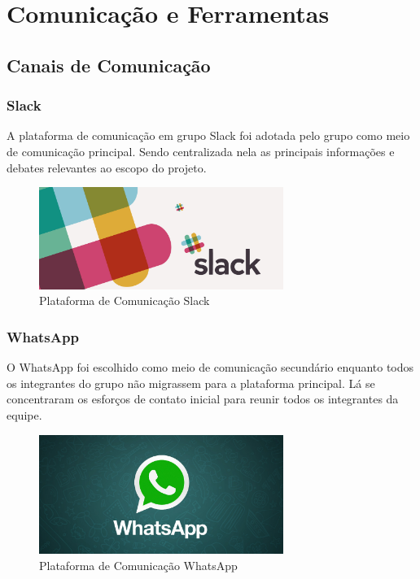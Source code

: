 \chapter[Comunicação e Ferramentas]{Comunicação e Ferramentas}

\section{Canais de Comunicação}

\subsection{Slack}
A plataforma de comunicação em grupo Slack foi adotada pelo grupo como meio de comunicação principal.
Sendo centralizada nela as principais informações e debates relevantes ao escopo do projeto.

\begin{figure}[h]
  \centering
  \includegraphics[width=300px, scale=0.5]{figuras/slack}
  \caption{Plataforma de Comunicação Slack}
  \label{table:slack}
\end{figure}


\subsection{WhatsApp}
O WhatsApp foi escolhido como meio de comunicação secundário enquanto todos os integrantes do grupo
não migrassem para a plataforma principal. Lá se concentraram os esforços de contato inicial para reunir
todos os integrantes da equipe.

\begin{figure}[h]
  \centering
  \includegraphics[width=300px, scale=0.5]{figuras/wpp}
  \caption{Plataforma de Comunicação WhatsApp}
  \label{table:wpp}
\end{figure}

